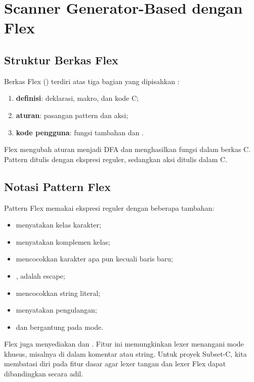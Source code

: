 \section{Scanner Generator-Based dengan Flex}
\label{sec:ch07-flex}

\subsection{Struktur Berkas Flex}

Berkas Flex () terdiri atas tiga bagian yang dipisahkan
\code{\%\%}:
\begin{enumerate}[label=\arabic*.,leftmargin=*]
  \item \textbf{definisi}: deklarasi, makro, dan kode C;
  \item \textbf{aturan}: pasangan pattern dan aksi;
  \item \textbf{kode pengguna}: fungsi tambahan dan .
\end{enumerate}

Flex mengubah aturan menjadi DFA dan menghasilkan fungsi
 dalam berkas C. Pattern ditulis dengan ekspresi
reguler, sedangkan aksi ditulis dalam C.

\subsection{Notasi Pattern Flex}

Pattern Flex memakai ekspresi reguler dengan beberapa tambahan:
\begin{itemize}[leftmargin=*]
  \item \code{[A-Za-z]} menyatakan kelas karakter;
  \item \code{[\^{}0-9]} menyatakan komplemen kelas;
  \item {} mencocokkan karakter apa pun kecuali baris baru;
  \item {},  adalah escape;
  \item {} mencocokkan string literal;
  \item {} menyatakan pengulangan;
  \item \code{\^{}} dan \code{\$} bergantung pada mode.
\end{itemize}

Flex juga menyediakan  dan . Fitur ini memungkinkan lexer menangani mode khusus,
misalnya di dalam komentar atau string. Untuk proyek Subset-C, kita
membatasi diri pada fitur dasar agar lexer tangan dan lexer Flex
dapat dibandingkan secara adil.

